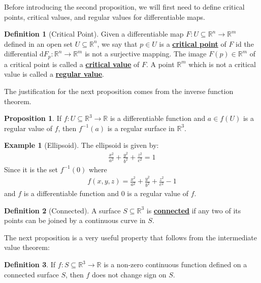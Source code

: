 \documentclass[11pt]{scrartcl}
\newcommand{\R}[0]{\mathbb{R}}
\theoremstyle{definition}
\newtheorem{definition}{Definition}
\newtheorem{prop}{Proposition}
\newtheorem{ex}{Example}
\theoremstyle{remark}
\newcommand{\dfn}[1]{\textbf{\underline{#1}}}
\begin{document}
{Before introducing the second proposition, we will first need to define critical points, critical values, and regular values for differentiable maps. 

\begin{definition}[Critical Point] 
	Given a differentiable map $F: U \subseteq \R^n \rightarrow \R^m$ defined in an open set $U \subseteq \R^n$, we say that $p \in U$ is a \dfn{critical point} of $F$ id the differential d$F_p: \R^n \rightarrow \R^m$ is not a surjective mapping. The image $F(p) \in \R^m$ of a critical point is called a \dfn{critical value} of $F$. A point $\R^m$ which is not a critical value is called a \dfn{regular value}. 
\end{definition}

The justification for the next proposition comes from the inverse function theorem. 

\begin{prop}
	If $f: U \subseteq \R^3 \rightarrow \R$ is a differentiable function and $a \in f(U)$ is a regular value of $f$, then $f^{-1}(a)$ is a regular surface in $\R^3$. 
\end{prop}

\begin{ex}[Ellipsoid] 
		The ellipsoid is given by: 
		\begin{align*}
			\frac{x^2}{a^2} + \frac{y^2}{b^2} + \frac{z^2}{c^2} = 1
		\end{align*}
		Since it is the set $f^{-1}(0)$ where 
		\begin{align*}
			f(x,y,z) = \frac{x^2}{a^2} + \frac{y^2}{b^2} + \frac{z^2}{c^2} - 1
		\end{align*}
		and $f$ is a differentiable function and $0$ is a regular value of $f$. 
\end{ex}

\begin{definition}[Connected] 
	A surface $S \subseteq \R^3$ is \dfn{connected} if any two of its points can be joined by a continuous curve in $S$. 
\end{definition}

The next proposition is a very useful property that follows from the intermediate value theorem: 

\begin{definition}
	If $f: S \subseteq \R^3 \rightarrow \R$ is a non-zero continuous function defined on a connected surface $S$, then $f$ does not change sign on $S$. 
\end{definition}



}
\end{document}
